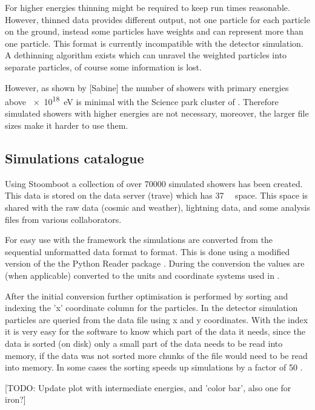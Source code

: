 For higher energies thinning might be required to keep run times
reasonable. However, thinned data provides different output, not one
particle for each particle on the ground, instead some particles have
weights and can represent more than one particle. This format is
currently incompatible with the detector simulation. A dethinning
algorithm exists \cite{stokes2012} which can unravel the weighted
particles into separate particles, of course some information is lost.

However, as shown by [Sabine] the number of showers with primary
energies above \SI{e18}{\eV} is minimal with the Science park
cluster of \hisparc. Therefore simulated showers with higher energies
are not necessary, moreover, the larger file sizes make it harder to
use them.


\subsection{Simulations catalogue}

Using Stoomboot a collection of over \num{70000} simulated showers has
been created. This data is stored on the \hisparc data server (trave)
which has \SI{37}{\tera\byte} space. This space is shared with the raw
\hisparc data (cosmic and weather), \knmi lightning data, and some
analysis files from various \hisparc collaborators.

For easy use with the \sapphire framework the \corsika simulations are
converted from the sequential unformatted \fortran data format to \hdf
format. This is done using a modified version of the the Python \corsika
Reader package \cite{gonzalez2011}. During the conversion the values are
(when applicable) converted to the units and coordinate systems used in
.

After the initial conversion further optimisation is performed by
sorting and indexing the 'x' coordinate column for the particles. In the
detector simulation particles are queried from the \corsika data file
using x and y coordinates. With the index it is very easy for the
software to know which part of the data it needs, since the data is
sorted (on disk) only a small part of the data needs to be read into
memory, if the data was not sorted more chunks of the file would need to
be read into memory. In some cases the sorting speeds up simulations by
a factor of 50 \cite{pytables:optimization}.

[TODO: Update plot with intermediate energies, and 'color bar', also one for iron?]

